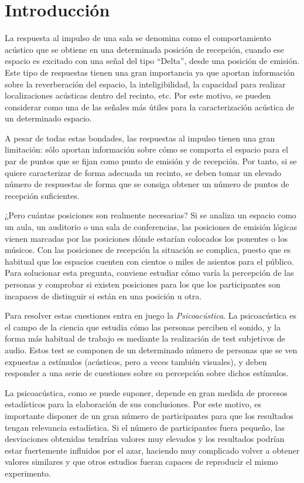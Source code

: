 \documentclass[11pt,a4paper]{book}
\author{Víctor de Tejada Molera}
\begin{document}
\tableofcontents
\listoffigures
\listoftables
\chapter{Introducción}
    La respuesta al impulso de una sala se denomina como el comportamiento acústico que se obtiene en una determinada posición de recepción, cuando ese espacio es excitado con una señal del tipo ``Delta'', desde una posición de emisión. Este tipo de respuestas tienen una gran importancia ya que aportan información sobre la reverberación del espacio, la inteligibilidad, la capacidad para realizar localizaciones acústicas dentro del recinto, etc. Por este motivo, se pueden considerar como una de las señales más útiles para la caracterización acústica de un determinado espacio. 
    
    A pesar de todas estas bondades, las respuestas al impulso tienen una gran limitación: sólo aportan información sobre cómo se comporta el espacio para el par de puntos que se fijan como punto de emisión y de recepción. Por tanto, si se quiere caracterizar de forma adecuada un recinto, se deben tomar un elevado número de respuestas de forma que se consiga obtener un número de puntos de recepción suficientes.
    
    ¿Pero cuántas posiciones son realmente necesarias? Si se analiza un espacio como un aula, un auditorio o una sala de conferencias, las posiciones de emisión lógicas vienen marcadas por las posiciones dónde estarían colocados los ponentes o los músicos. Con las posiciones de recepción la situación se complica, puesto que es habitual que los espacios cuenten con cientos o miles de asientos para el público. Para solucionar esta pregunta, conviene estudiar cómo varía la percepción de las personas y comprobar si existen posiciones para los que los participantes son incapaces de distinguir si están en una posición u otra.
    
    Para resolver estas cuestiones entra en juego la \textit{Psicoacústica}. La psicoacústica es el campo de la ciencia que estudia cómo las personas perciben el sonido, y la forma más habitual de trabajo es mediante la realización de test subjetivos de audio. Estos test se componen de un determinado número de personas que se ven expuestas a estímulos (acústicos, pero a veces también visuales), y deben responder a una serie de cuestiones sobre su percepción sobre dichos estímulos.
    
    La psicoacústica, como se puede suponer, depende en gran medida de procesos estadísticos para la elaboración de sus conclusiones. Por este motivo, es importante disponer de un gran número de participantes para que los resultados tengan relevancia estadística. Si el número de participantes fuera pequeño, las desviaciones obtenidas tendrían valores muy elevados y los resultados podrían estar fuertemente influidos por el azar, haciendo muy complicado volver a obtener valores similares y que otros estudios fueran capaces de reproducir el mismo experimento.
    
\end{document}
